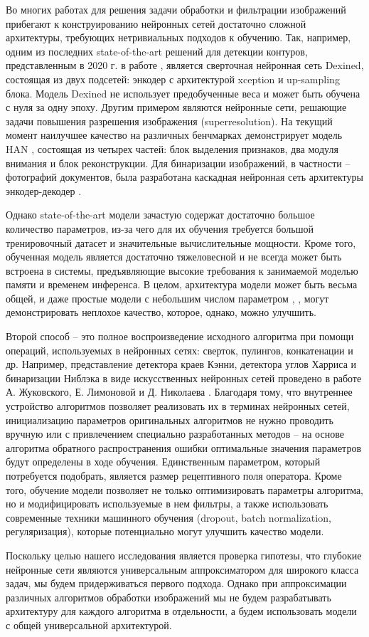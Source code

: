 Во многих работах для решения задачи обработки и фильтрации изображений прибегают к конструированию нейронных сетей достаточно сложной архитектуры, требующих нетривиальных подходов к обучению. Так, например, одним из последних state-of-the-art решений для детекции контуров, представленным в 2020 г. в работе \cite{Soria2020DenseEI}, является сверточная нейронная сеть Dexined, состоящая из двух подсетей: энкодер с архитектурой xception и up-sampling блока. Модель Dexined не использует предобученные веса и может быть обучена с нуля за одну эпоху. Другим примером являются нейронные сети, решающие задачи повышения разрешения изображения (superresolution). На текущий момент наилучшее качество на различных бенчмарках демонстрирует модель HAN \cite{Niu2020SingleIS}, состоящая из четырех частей: блок выделения признаков, два модуля внимания и блок реконструкции. Для бинаризации изображений, в частности – фотографий документов, была разработана каскадная нейронная сеть архитектуры энкодер-декодер \cite{Sheng2021CTNet}.

Однако state-of-the-art модели зачастую содержат достаточно большое количество параметров, из-за чего для их обучения требуется большой тренировочный датасет и значительные вычислительные мощности. Кроме того, обученная модель является достаточно тяжеловесной и не всегда может быть встроена в системы, предъявляющие высокие требования к занимаемой моделью памяти и временем инференса. В целом, архитектура модели может быть весьма общей, и даже простые модели с небольшим числом параметром \cite{Ridder99Kuwahara}, \cite{Fernandez11}, \cite{Febbo2018KCNN} могут демонстрировать неплохое качество, которое, однако, можно улучшить.

Второй способ – это полное воспроизведение исходного алгоритма при помощи операций, используемых в нейронных сетях: сверток, пулингов, конкатенации и др. Например, представление детектора краев Кэнни, детектора углов Харриса и бинаризации Ниблэка в виде искусственных нейронных сетей проведено в работе А. Жуковского, Е. Лимоновой и Д. Николаева \cite{Zhukovsky2018}. Благодаря тому, что внутреннее устройство алгоритмов позволяет реализовать их в терминах нейронных сетей, инициализацию параметров оригинальных алгоритмов не нужно проводить вручную или с привлечением специально разработанных методов – на основе алгоритма обратного распространения ошибки оптимальные значения параметров будут определены в ходе обучения. Единственным параметром, который потребуется подобрать, является размер рецептивного поля оператора. Кроме того, обучение модели позволяет не только оптимизировать параметры алгоритма, но и модифицировать используемые в нем фильтры, а также использовать современные техники машинного обучения (dropout, batch normalization, регуляризация), которые потенциально могут улучшить качество модели.

Поскольку целью нашего исследования является проверка гипотезы, что глубокие нейронные сети являются универсальным аппроксиматором для широкого класса задач, мы будем придерживаться первого подхода. Однако при аппроксимации различных алгоритмов обработки изображений мы не будем разрабатывать архитектуру для каждого алгоритма в отдельности, а будем использовать модели с общей универсальной архитектурой.

